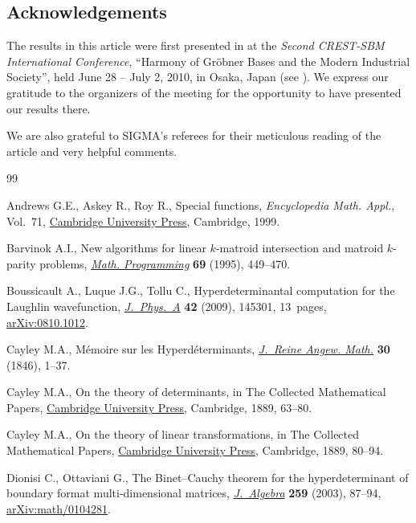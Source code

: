 \documentclass[pdftex]{sigma}
\numberwithin{equation}{section}
\begin{document}
\subsection*{Acknowledgements}
The results in this article were first presented in \cite{Johnson_Richards} at the {\it Second CREST-SBM International Conference}, ``Harmony of Gr\"obner Bases and the Modern Industrial Society'', held June 28 -- July 2, 2010, in Osaka, Japan (see \cite{Hibi}). We express our gratitude to the organizers of the meeting for the opportunity to have presented our results there.

We are also grateful to SIGMA's referees for their meticulous reading of the article and very helpful comments.

\begin{thebibliography}{99}
\footnotesize\itemsep=0pt

Andrews G.E., Askey R., Roy R., Special functions, \textit{Encyclopedia Math.
 Appl.}, Vol.~71, \href{https://doi.org/10.1017/CBO9781107325937}{Cambridge
 University Press}, Cambridge, 1999.

Barvinok A.I., New algorithms for linear {$k$}-matroid intersection and matroid
 {$k$}-parity problems,
 \href{https://doi.org/10.1007/BF01585571}{\textit{Math. Programming}}
 \textbf{69} (1995), 449--470.

Boussicault A., Luque J.G., Tollu C., Hyperdeterminantal computation for the
 {L}aughlin wavefunction,
 \href{https://doi.org/10.1088/1751-8113/42/14/145301}{\textit{J.~Phys.~A}}
 \textbf{42} (2009), 145301, 13~pages,
 \href{http://arxiv.org/abs/0810.1012}{arXiv:0810.1012}.

Cayley M.A., M\'emoire sur les {H}yperd\'eterminants,
 \href{https://doi.org/10.1515/crll.1846.30.1}{\textit{J.~Reine Angew. Math.}}
 \textbf{30} (1846), 1--37.

Cayley M.A., On the theory of determinants, in The {C}ollected {M}athematical
 {P}apers, \href{https://doi.org/10.1017/CBO9780511703676.013}{Cambridge
 University Press}, Cambridge, 1889, 63--80.

Cayley M.A., On the theory of linear transformations, in The {C}ollected
 {M}athematical {P}apers,
 \href{https://doi.org/10.1017/CBO9780511703676.014}{Cambridge University
 Press}, Cambridge, 1889, 80--94.

Dionisi C., Ottaviani G., The {B}inet--{C}auchy theorem for the
 hyperdeterminant of boundary format multi-dimensional matrices,
 \href{https://doi.org/10.1016/S0021-8693(02)00537-9}{\textit{J.~Algebra}}
 \textbf{259} (2003), 87--94,
 \href{http://arxiv.org/abs/math/0104281}{arXiv:math/0104281}.


\end{thebibliography}
\end{document}
